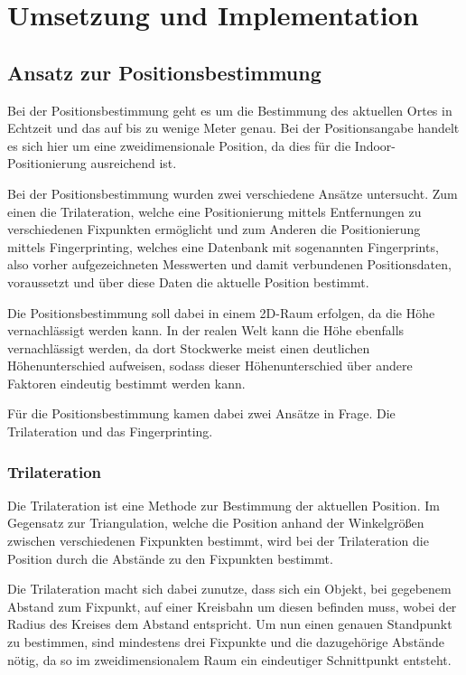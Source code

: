 \chapter{Umsetzung und Implementation}
\label{chap:implementation}

\section{Ansatz zur Positionsbestimmung}
\label{sec:implementation:positioning}
Bei der Positionsbestimmung geht es um die Bestimmung des aktuellen Ortes in Echtzeit und das auf bis zu wenige Meter genau. Bei der Positionsangabe handelt es sich hier um eine zweidimensionale Position, da dies für die Indoor-Positionierung ausreichend ist.

Bei der Positionsbestimmung wurden zwei verschiedene Ansätze untersucht. Zum einen die Trilateration, welche eine Positionierung mittels Entfernungen zu verschiedenen Fixpunkten ermöglicht und zum Anderen die Positionierung mittels Fingerprinting, welches eine Datenbank mit sogenannten Fingerprints, also vorher aufgezeichneten Messwerten und damit verbundenen Positionsdaten, voraussetzt und über diese Daten die aktuelle Position bestimmt.

Die Positionsbestimmung soll dabei in einem 2D-Raum erfolgen, da die Höhe vernachlässigt werden kann. In der realen Welt kann die Höhe ebenfalls vernachlässigt werden, da dort Stockwerke meist einen deutlichen Höhenunterschied aufweisen, sodass dieser Höhenunterschied über andere Faktoren eindeutig bestimmt werden kann.

Für die Positionsbestimmung kamen dabei zwei Ansätze in Frage. Die Trilateration und das Fingerprinting.

\subsection{Trilateration}
\label{sec:implementation:trilateration}
Die Trilateration ist eine Methode zur Bestimmung der aktuellen Position. Im Gegensatz zur Triangulation, welche die Position anhand der Winkelgrößen zwischen verschiedenen Fixpunkten bestimmt, wird bei der Trilateration die Position durch die Abstände zu den Fixpunkten bestimmt. 

Die Trilateration macht sich dabei zunutze, dass sich ein Objekt, bei gegebenem Abstand zum Fixpunkt, auf einer Kreisbahn um diesen befinden muss, wobei der Radius des Kreises dem Abstand entspricht. Um nun einen genauen Standpunkt zu bestimmen, sind mindestens drei Fixpunkte und die dazugehörige Abstände nötig, da so im zweidimensionalem Raum ein eindeutiger Schnittpunkt entsteht.

